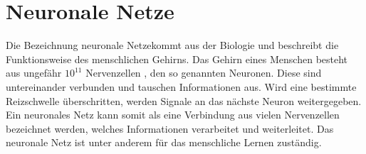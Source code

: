 \documentclass[a4paper,12pt,oneside]{article}
\begin{document}
  \section{Neuronale Netze}  
Die Bezeichnung \glqq neuronale Netze\grqq kommt aus der Biologie und beschreibt die Funktionsweise des menschlichen Gehirns. Das Gehirn eines Menschen besteht aus ungefähr $10^{11}$ Nervenzellen \cite[265ff.]{ertel2013grundkurs}, den so genannten Neuronen. Diese sind untereinander verbunden und tauschen Informationen aus. Wird eine bestimmte Reizschwelle überschritten, werden Signale an das nächste Neuron weitergegeben. Ein neuronales Netz kann somit als eine Verbindung aus vielen Nervenzellen bezeichnet werden, welches Informationen verarbeitet und weiterleitet. Das neuronale Netz ist unter anderem für das menschliche Lernen zuständig. 
\\
\end{document}
